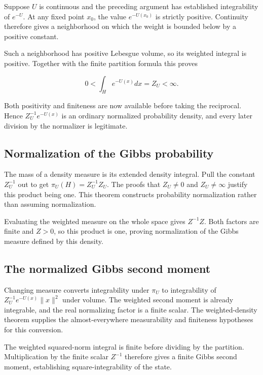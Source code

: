 \documentclass[11pt,a4paper]{article}
\begin{document}
Suppose \(U\) is continuous and the preceding argument has established integrability of \(e^{-U}\). At any fixed point \(x_0\), the value \(e^{-U(x_0)}\) is strictly positive. Continuity therefore gives a neighborhood on which the weight is bounded below by a positive constant.



Such a neighborhood has positive Lebesgue volume, so its weighted integral is positive. Together with the finite partition formula this proves

\[0<\int_H e^{-U(x)}dx=Z_U<\infty.\]


Both positivity and finiteness are now available before taking the reciprocal. Hence \(Z_U^{-1}e^{-U(x)}\) is an ordinary normalized probability density, and every later division by the normalizer is legitimate.


\subsection{\texorpdfstring{Normalization of the Gibbs probability}{Normalization of the Gibbs probability}}


The mass of a density measure is its extended density integral. Pull the constant \(Z_U^{-1}\) out to get \(\pi_U(H)=Z_U^{-1}Z_U\). The proofs that \(Z_U\ne0\) and \(Z_U\ne\infty\) justify this product being one. This theorem constructs probability normalization rather than assuming normalization.



Evaluating the weighted measure on the whole space gives \(Z^{-1}Z\). Both factors are finite and \(Z>0\), so this product is one, proving normalization of the Gibbs measure defined by this density.


\subsection{\texorpdfstring{The normalized Gibbs second moment}{The normalized Gibbs second moment}}


Changing measure converts integrability under \(\pi_U\) to integrability of \(Z_U^{-1}e^{-U(x)}\|x\|^2\) under volume. The weighted second moment is already integrable, and the real normalizing factor is a finite scalar. The weighted-density theorem supplies the almost-everywhere measurability and finiteness hypotheses for this conversion.



The weighted squared-norm integral is finite before dividing by the partition. Multiplication by the finite scalar \(Z^{-1}\) therefore gives a finite Gibbs second moment, establishing square-integrability of the state.
\end{document}
